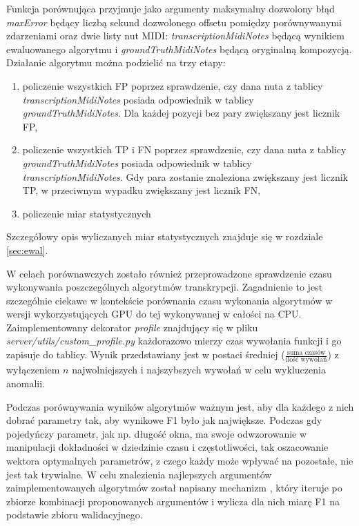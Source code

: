 \documentclass[12pt,a4paper,twoside]{mwart}
\begin{document}
Funkcja porównująca przyjmuje jako argumenty maksymalny dozwolony błąd \textit{maxError} będący liczbą sekund dozwolonego offsetu pomiędzy porównywanymi zdarzeniami oraz dwie listy nut MIDI: \textit{transcriptionMidiNotes} będącą wynikiem ewaluowanego algorytmu i \textit{groundTruthMidiNotes} będącą oryginalną kompozycją. Działanie algorytmu można podzielić na trzy etapy:
\begin{enumerate}
  \item policzenie wszystkich FP poprzez sprawdzenie, czy dana nuta z tablicy \textit{transcriptionMidiNotes} posiada odpowiednik w tablicy \textit{groundTruthMidiNotes}. Dla każdej pozycji bez pary zwiększany jest licznik FP,
  \item policzenie wszystkich TP i FN poprzez sprawdzenie, czy dana nuta z tablicy \textit{groundTruthMidiNotes} posiada odpowiednik w tablicy \textit{transcriptionMidiNotes}. Gdy para zostanie znaleziona zwiększany jest licznik TP, w przeciwnym wypadku zwiększany jest licznik FN,
  \item policzenie miar statystycznych
\end{enumerate}
Szczegółowy opis wyliczanych miar statystycznych znajduje się w rozdziale \ref{sec:ewal}.

W celach porównawczych zostało również przeprowadzone sprawdzenie czasu wykonywania poszczególnych algorytmów transkrypcji. Zagadnienie to jest szczególnie ciekawe w kontekście porównania czasu wykonania algorytmów w wersji wykorzystujących GPU do tej wykonywanej w całości na CPU. Zaimplementowany dekorator \textit{profile} znajdujący się w pliku \textit{server/utils/custom\_profile.py} każdorazowo mierzy czas wywołania funkcji i go zapisuje do tablicy. Wynik przedstawiany jest w postaci średniej ($\frac{\textrm{suma czasów}}{\textrm{ilość wywołań}}$) z wyłączeniem $n$ najwolniejszych i najszybszych wywołań w celu wykluczenia anomalii.

Podczas porównywania wyników algorytmów ważnym jest, aby dla każdego z nich dobrać parametry tak, aby wynikowe F1 było jak największe. Podczas gdy pojedyńczy parametr, jak np. długość okna, ma swoje odwzorowanie w manipulacji dokładności w dziedzinie czasu i częstotliwości, tak oszacowanie wektora optymalnych parametrów, z czego każdy może wpływać na pozostałe, nie jest tak trywialne. W celu znalezienia najlepszych argumentów zaimplementowanych algorytmów został napisany mechanizm , który iteruje po zbiorze kombinacji proponowanych argumentów i wylicza dla nich miarę F1 na podstawie zbioru walidacyjnego. 
\end{document}
